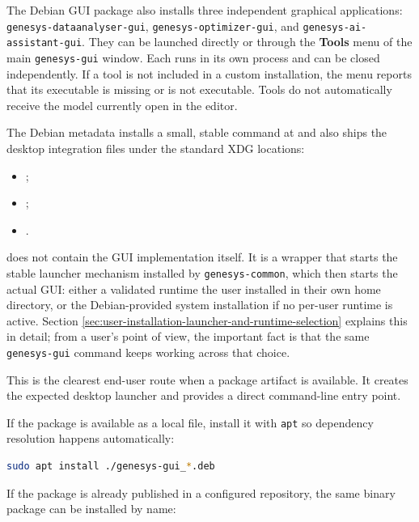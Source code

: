The Debian GUI package also installs three independent graphical
applications: \texttt{genesys-dataanalyser-gui},
\texttt{genesys-optimizer-gui}, and
\texttt{genesys-ai-assistant-gui}. They can be launched directly or through
the \textbf{Tools} menu of the main \texttt{genesys-gui} window. Each
runs in its own process and can be closed independently. If a tool is
not included in a custom installation, the menu reports that its
executable is missing or is not executable. Tools do not automatically
receive the model currently open in the editor.

The Debian metadata installs a small, stable command at
 and also ships the desktop integration files under
the standard XDG locations:
\begin{itemize}
\item {};
\item {};
\item {}.
\end{itemize}

 does not contain the GUI implementation itself.
It is a wrapper that starts the stable launcher mechanism installed by
\texttt{genesys-common}, which then starts the actual GUI: either a validated
runtime the user installed in their own home directory, or the
Debian-provided system installation if no per-user runtime is active. Section
\ref{sec:user-installation-launcher-and-runtime-selection} explains this in
detail; from a user's point of view, the important fact is that the same
\texttt{genesys-gui} command keeps working across that choice.

This is the clearest end-user route when a package artifact is available. It
creates the expected desktop launcher and provides a direct command-line entry
point.

If the package is available as a local file, install it with \texttt{apt} so
dependency resolution happens automatically:

\begin{lstlisting}[language=bash,caption={Installing the local GenESyS Debian package},label={lst:user-installation-local-deb}]
sudo apt install ./genesys-gui_*.deb
\end{lstlisting}

If the package is already published in a configured repository, the same binary
package can be installed by name:

